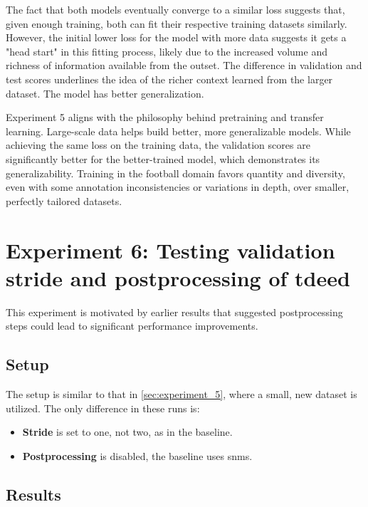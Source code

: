 The fact that both models eventually converge to a similar loss suggests that, given enough training, both can fit their respective training datasets similarly. However, the initial lower loss for the model with more data suggests it gets a "head start" in this fitting process, likely due to the increased volume and richness of information available from the outset. The difference in validation and test scores underlines the idea of the richer context learned from the larger dataset. The model has better generalization. 

Experiment 5 aligns with the philosophy behind pretraining and transfer learning. Large-scale data helps build better, more generalizable models. While achieving the same loss on the training data, the validation scores are significantly better for the better-trained model, which demonstrates its generalizability. Training in the football domain favors quantity and diversity, even with some annotation inconsistencies or variations in depth, over smaller, perfectly tailored datasets.

\section{Experiment 6: Testing validation stride and postprocessing of \acrshort{tdeed}}
\label{sec:experiment_6}

This experiment is motivated by earlier results that suggested postprocessing steps could lead to significant performance improvements. 

\subsection{Setup}
\label{ssec:ex6_setup}
The setup is similar to that in \cref{sec:experiment_5}, where a small, new dataset is utilized. The only difference in these runs is:

\begin{itemize}
    \item \textbf{Stride} is set to one, not two, as in the baseline.
    \item \textbf{Postprocessing} is disabled, the baseline uses \acrlong{snms}.
\end{itemize}

\subsection{Results}
\label{ssec:ex6_results}

